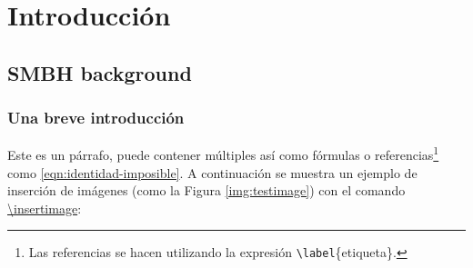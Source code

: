 %
%

\chapter{Introducción}

\section{SMBH background}

\lipsum[4]

\subsection{Una breve introducción}
	
	Este es un párrafo, puede contener múltiples  así como fórmulas o referencias\footnote{Las referencias se hacen utilizando la expresión \texttt{\textbackslash label}\{etiqueta\}.} como \eqref{eqn:identidad-imposible}. A continuación se muestra un ejemplo de inserción de imágenes (como la Figura \ref{img:testimage}) con el comando \href{https://latex.ppizarror.com/informe.html#hlp-imagen}{\textbackslash insertimage}:

		

